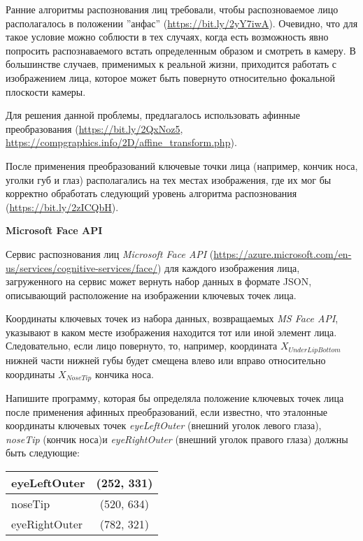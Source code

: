 
Ранние алгоритмы распознования лиц требовали, чтобы распозноваемое лицо располагалось в положении ''анфас'' (\url{https://bit.ly/2yY7iwA}).
Очевидно, что для такое условие можно соблюсти в тех случаях, когда есть возможность явно попросить распознаваемого встать определенным образом и смотреть в камеру.
В большинстве случаев, применимых к реальной жизни, приходится работать с изображением лица, которое может быть повернуто относительно фокальной плоскости камеры.

Для решения данной проблемы, предлагалось использовать афинные преобразования (\url{https://bit.ly/2QxNoz5}, \url{https://compgraphics.info/2D/affine_transform.php}).


После применения преобразований ключевые точки лица (например, кончик носа, уголки губ и глаз) располагались на тех местах изображения, где их мог бы корректно обработать следующий уровень алгоритма распознования (\url{https://bit.ly/2zICQbH}).

\textbf{Microsoft Face API}

Сервис распознования лиц \textit{Microsoft Face API} (\url{https://azure.microsoft.com/en-us/services/cognitive-services/face/}) для каждого изображения лица, загруженного на сервис может вернуть набор данных в формате JSON, описывающий расположение на изображении ключевых точек лица.


Координаты ключевых точек из набора данных, возвращаемых \textit{MS Face API}, указывают в каком месте изображения находится тот или иной элемент лица.
Следовательно, если лицо повернуто, то, например, координата $X_{UnderLipBottom}$ нижней части нижней губы будет смещена влево или вправо относительно координаты $X_{NoseTip}$ кончика носа.

Напишите программу, которая бы определяла положение ключевых точек лица после применения афинных преобразований, если известно, что эталонные координаты ключевых точек \textit{eyeLeftOuter} (внешний уголок левого глаза), \textit{noseTip} (кончик носа)и \textit{eyeRightOuter} (внешний уголок правого глаза) должны быть следующие:

\begin{table}[h!]
\centering
\begin{tabular}{|l|c|}
\hline
eyeLeftOuter  & (252, 331) \\ \hline
noseTip       & (520, 634) \\ \hline
eyeRightOuter & (782, 321) \\
\hline
\end{tabular}
\end{table}


